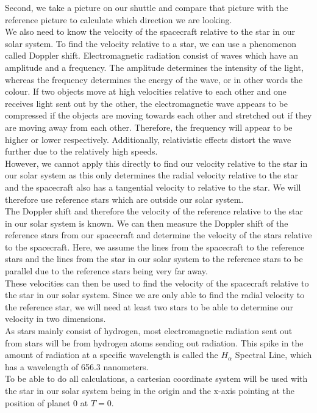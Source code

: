 \documentclass[reprint,english,notitlepage]{revtex4-2}
\begin{document}
Second, we take a picture on our shuttle and compare that picture with the reference picture to calculate which direction we are looking.\\
We also need to know the velocity of the spacecraft relative to the star in our solar system.
To find the velocity relative to a star, we can use a phenomenon called Doppler shift.
Electromagnetic radiation consist of waves which have an amplitude and a frequency.
The amplitude determines the intensity of the light, whereas the frequency determines the energy of the wave, or in other words the colour.
If two objects move at high velocities relative to each other and one receives light sent out by the other, the electromagnetic wave appears to be compressed if the objects are moving towards each other and stretched out if they are moving away from each other.
Therefore, the frequency will appear to be higher or lower respectively.
Additionally, relativistic effects distort the wave further due to the relatively high speeds.\\
However, we cannot apply this directly to find our velocity relative to the star in our solar system as this only determines the radial velocity relative to the star and the spacecraft also has a tangential velocity to relative to the star.
We will therefore use reference stars which are outside our solar system.\\
The Doppler shift and therefore the velocity of the reference relative to the star in our solar system is known.
We can then measure the Doppler shift of the reference stars from our spacecraft and determine the velocity of the stars relative to the spacecraft.
Here, we assume the lines from the spacecraft to the reference stars and the lines from the star in our solar system to the reference stars to be parallel due to the reference stars being very far away.\\
These velocities can then be used to find the velocity of the spacecraft relative to the star in our solar system.
Since we are only able to find the radial velocity to the reference star, we will need at least two stars to be able to determine our velocity in two dimensions.\\
As stars mainly consist of hydrogen, most electromagnetic radiation sent out from stars will be from hydrogen atoms sending out radiation.
This spike in the amount of radiation at a specific wavelength is called the $H_{\alpha}$ Spectral Line, which has a wavelength of 656.3 nanometers.\\
To be able to do all calculations, a cartesian coordinate system will be used with the star in our solar system being in the origin and the x-axis pointing at the position of planet 0 at $T = 0$.
\end{document}
